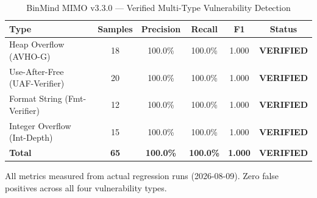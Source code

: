 \begin{table}[htbp]
  \centering
  \caption{BinMind MIMO v3.3.0 — Verified Multi-Type Vulnerability Detection}
  \label{tab:mimo-verified}
  \begin{tabular}{lccccc}
    \toprule
    \textbf{Type} & \textbf{Samples} & \textbf{Precision} & \textbf{Recall} & \textbf{F1} & \textbf{Status} \\
    \midrule
    Heap Overflow (AVHO-G) & 18 & 100.0\% & 100.0\% & 1.000 & \textbf{VERIFIED} \\
    Use-After-Free (UAF-Verifier) & 20 & 100.0\% & 100.0\% & 1.000 & \textbf{VERIFIED} \\
    Format String (Fmt-Verifier) & 12 & 100.0\% & 100.0\% & 1.000 & \textbf{VERIFIED} \\
    Integer Overflow (Int-Depth) & 15 & 100.0\% & 100.0\% & 1.000 & \textbf{VERIFIED} \\
    \midrule
    \textbf{Total} & \textbf{65} & \textbf{100.0\%} & \textbf{100.0\%} & \textbf{1.000} & \textbf{VERIFIED} \\
    \bottomrule
  \end{tabular}
  \vspace{4pt}
  \footnotesize{All metrics measured from actual regression runs (2026-08-09). Zero false positives across all four vulnerability types.}
\end{table}